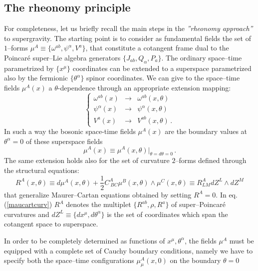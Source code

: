 \documentclass[a4paper,12pt]{article}
\newcommand{\ft}[2]{{\textstyle\frac{#1}{#2}}}
\begin{document}
\subsection{The rheonomy principle}
For completeness, let us briefly recall the main steps in the
{\sl ''rheonomy approach''} to supergravity.
The starting point is to consider as fundamental fields the set of $1$--forms
$\mu^A\equiv\{\omega^{ab},\psi^{\alpha}, V^a\}$, that constitute
a cotangent frame dual to the Poincar\'e super--Lie algebra generators
$\{J_{ab},Q_{\alpha},P_a\}$.
The ordinary space--time parametrized by $\{x^{\mu}\}$ coordinates
can be extended to a superspace
parametrized also by the fermionic  $\{\theta^{\alpha}\}$ spinor coordinates.
We can give to the space--time fields
$\mu^A(x)$ a $\theta$-dependence through an appropriate extension mapping:
\begin{equation}
\label{rheomap}
\left\{
\begin{array}{lcl}
\omega^{ab}(x) &\rightarrow& \omega^{ab}(x,\theta) \\
\psi^{\alpha}(x) &\rightarrow& \psi^{\alpha}(x,\theta) \\
V^{a}(x) &\rightarrow& V^{ab}(x,\theta) \,.
\end{array}
\right.
\end{equation}
In such a way the bosonic space-time fields $\mu^A(x)$ are the
boundary values at $\theta^{\alpha}=0$ of these superspace fields
\begin{equation}
\mu^A(x)\equiv \mu^A(x,\theta)| _{\theta =d\theta =0}\,.
\end{equation}
The same extension holds also  for the set of curvature $2$--forms defined through the
structural equations:
\begin{equation}
R^A(x,\theta)\equiv d\mu^A(x,\theta)+{\ft 1 2} C^A_{~BC}\mu^B(x,\theta)\wedge\mu^C(x,\theta)
\equiv R^A_{LM}dZ^L\wedge dZ^M
\label{maucartcurv}
\end{equation}
that generalize Maurer--Cartan equations obtained by setting $R^A=0$.
In eq. (\ref{maucartcurv})
$R^A$ denotes the multiplet $\{R^{ab},\rho,R^a\}$ of super--Poincar\'e curvatures
and $dZ^L\equiv\{dx^{\mu},d\theta^{\alpha}\}$ is the set of coordinates which
span the cotangent space to superspace.
\par
In order to be completely determined as functions of
$x^{\mu},\theta^{\alpha}$, the fields $\mu^A$  must be equipped
with a complete set of Cauchy boundary conditions, namely we have to specify both
the space--time configurations $\mu^A_{\mu}(x,0)$ on the boundary $\theta =0$
\end{document}
